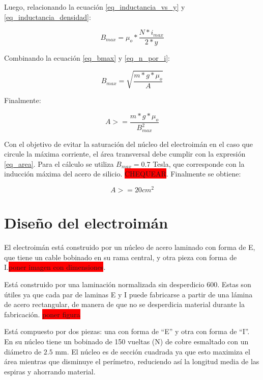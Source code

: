 \noindent Luego, relacionando la ecuación \ref{eq_inductancia_vs_y} y \ref{eq_inductancia_densidad}:

\begin{equation} \label{eq_bmax}
	B_{max}=\mu_{o}*\frac{N*i_{max}}{2*y}
\end{equation}

\noindent Combinando la ecuación \ref{eq_bmax} y \ref{eq_n_por_i}:

\begin{equation}
	B_{max}=\sqrt{\frac{m*g*\mu_{o}}{A}}
\end{equation}

\noindent Finalmente:

\begin{equation} \label{eq_area}
	A>=\frac{m*g*\mu_{o}}{B_{max}^{2}}
\end{equation}

\noindent Con el objetivo de evitar la saturación del núcleo del electroimán en el caso que circule la máxima corriente, el área transversal debe cumplir con la expresión \ref{eq_area}. Para el cálculo se utiliza $B_{max}=0.7$ Tesla, que corresponde con la inducción máxima del acero de silicio. \colorbox{red}{CHEQUEAR}. Finalmente se obtiene:

\begin{equation}
	A>=20 cm^{2}
\end{equation}


\section{Diseño del electroimán}

\noindent El electroimán está construido por un núcleo de acero laminado con forma de E, que tiene un cable bobinado en su rama central, y otra pieza con forma de I.\colorbox{red}{poner imagen con dimensiones}. 
% 

Está construido por una laminación normalizada sin desperdicio 600. Estas son útiles ya que cada par de laminas E y I puede fabricarse a partir de una lámina de acero rectangular, de manera de que no se desperdicia material durante la fabricación. \colorbox{red}{poner figura}

 Está compuesto por dos piezas: una con forma de “E” y otra con forma de “I”. En su núcleo tiene un bobinado de 150 vueltas (N) de cobre esmaltado con un diámetro de $2.5$ mm. El núcleo es de sección cuadrada ya que esto maximiza el área mientras que disminuye el perímetro, reduciendo así la longitud media de las espiras y ahorrando material. 


